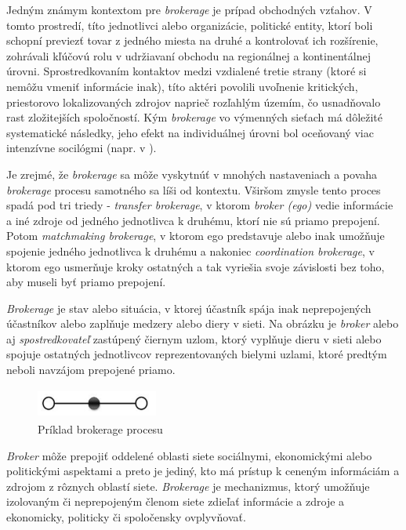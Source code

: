 \documentclass[slovak,master,public,dept460,male,cpdeclaration,oneside]{diploma}
\begin{document}
Jedným známym kontextom pre \textit{brokerage} je prípad obchodných vzťahov. V tomto prostredí, títo jednotlivci alebo organizácie, politické entity, ktorí boli schopní previezť tovar z jedného miesta na druhé a kontrolovať ich rozšírenie, zohrávali kľúčovú rolu v udržiavaní obchodu na regionálnej a kontinentálnej úrovni. Sprostredkovaním kontaktov medzi vzdialené tretie strany (ktoré si nemôžu vmeniť informácie inak), títo aktéri povolili uvoľnenie kritických, priestorovo lokalizovaných zdrojov naprieč rozľahlým územím, čo usnadňovalo rast zložitejších spoločností.  Kým \textit{brokerage} vo výmenných sieťach má dôležité systematické následky, jeho efekt na individuálnej úrovni bol oceňovaný viac intenzívne socilógmi (napr. v \cite{15} \cite{17} \cite{18}). 


Je zrejmé, že \textit{brokerage} sa môže vyskytnúť v mnohých nastaveniach a povaha \textit{brokerage} procesu samotného sa líši od kontextu. Vširšom zmysle tento proces spadá pod tri triedy - \textit{transfer brokerage}, v ktorom \textit{broker (ego)} vedie informácie a iné zdroje od jedného jednotlivca k druhému, ktorí nie sú priamo prepojení. Potom \textit{matchmaking brokerage}, v ktorom ego predstavuje alebo inak umožňuje spojenie jedného jednotlivca k druhému a nakoniec \textit{coordination brokerage}, v ktorom ego usmerňuje kroky ostatných a tak vyriešia svoje závislosti bez toho, aby museli byť priamo prepojení.


\textit{Brokerage} je stav alebo situácia, v ktorej účastník spája inak neprepojených účastníkov alebo zaplňuje medzery alebo diery v sieti. \cite{15} Na obrázku je \textit{broker} alebo aj \textit{spostredkovateľ} zastúpený čiernym uzlom, ktorý vyplňuje dieru v sieti alebo spojuje ostatných jednotlivcov reprezentovaných bielymi uzlami, ktoré predtým neboli navzájom prepojené priamo.

\begin{figure}[H]
\centering
\includegraphics[width=4cm, height=1cm]{figures/brokerage_example}
\caption{Príklad brokerage procesu}
\end{figure}

\textit{Broker} môže prepojiť oddelené oblasti siete sociálnymi, ekonomickými alebo politickými aspektami a preto je jediný, kto má prístup k ceneným informáciám a zdrojom z rôznych oblastí siete. \textit{Brokerage} je mechanizmus, ktorý umožňuje izolovaným či neprepojeným členom siete zdieľať informácie a zdroje a ekonomicky, politicky či spoločensky ovplyvňovať. \cite{16}
\end{document}
